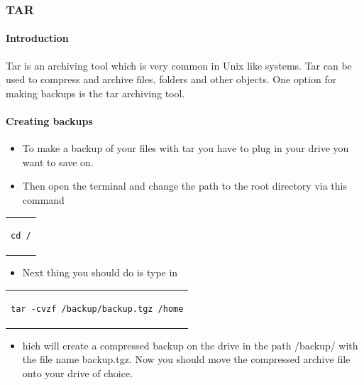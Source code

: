 \documentclass[a4paper,10pt]{article}
\begin{document}
\subsubsection{TAR}

\paragraph{Introduction}
Tar is an archiving tool which is very common in Unix like systems. Tar can be used to compress and archive files, folders and other objects. One option for making backups is the tar archiving tool. 


\paragraph{Creating backups}
\begin{itemize}[leftmargin=*]
\item To make a backup of your files with tar you have to plug in your drive you want to save on.
\item Then open the terminal and change the path to the root directory via this command
\end{itemize}

\begin{center}
\begin{tabular}{c}
\begin{lstlisting}
cd /
\end{lstlisting}
\end{tabular}
\end{center}

\begin{itemize}[leftmargin=*]
\item Next thing you should do is type in
\end{itemize}

\begin{center}
\begin{tabular}{c}
\begin{lstlisting}
tar -cvzf /backup/backup.tgz /home
\end{lstlisting}
\end{tabular}
\end{center}

\begin{itemize}[leftmargin=*]

\item hich will create a compressed backup on the drive in the path /backup/ with the file name backup.tgz. Now you should move the compressed archive file onto your drive of choice.
\end{itemize}
\end{document}
